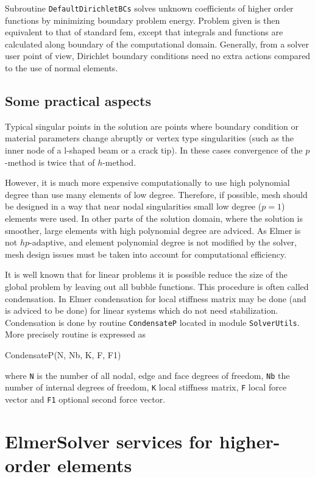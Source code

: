 Subroutine \texttt{DefaultDirichletBCs} solves unknown coefficients of higher order functions by minimizing boundary problem energy. Problem given is then equivalent to that of standard fem, except that integrals and functions are calculated along boundary of the computational domain. Generally, from a solver user point of view, Dirichlet boundary conditions need no extra actions compared to the use of normal elements. 

\subsection{Some practical aspects}

Typical singular points in the solution are points where boundary condition or material parameters change abruptly or vertex type singularities (such as the inner node of a l-shaped beam or a crack tip). In these cases convergence of the $p$-method is twice that of $h$-method. 

However, it is much more expensive computationally to use high polynomial degree than use many elements of low degree. Therefore, if possible,  mesh should be designed in a way that near nodal singularities small low degree ($p=1$) elements were used. In other parts of the solution domain, where the solution is smoother, large elements with high polynomial degree are adviced. As Elmer is not $hp$-adaptive, and element polynomial degree is not modified by the solver, mesh design issues must be taken into account for computational efficiency. 

It is well known that for linear problems it is possible reduce the size of the global problem by leaving out all bubble functions. This procedure is often called condensation. In Elmer condensation for local stiffness matrix may be done (and is adviced to be done) for linear systems which do not need stabilization. Condensation is done by routine \texttt{CondensateP} located in module \texttt{SolverUtils}. More precisely routine is expressed as

\ttbegin
CondensateP(N, Nb, K, F, F1)
\ttend

\noindent where \texttt{N} is the number of all nodal, edge and face degrees of freedom, \texttt{Nb} the number of internal degrees of freedom, \texttt{K} local stiffness matrix, \texttt{F} local force vector and \texttt{F1} optional second force vector.

\section{ElmerSolver services for higher-order elements} 

